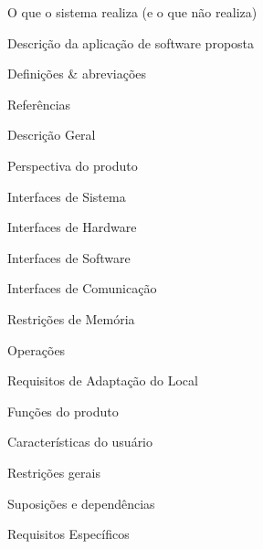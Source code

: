 ﻿\documentclass[12pt,a4paper]{article}
\begin{document}
\hspace{2cm}O que o sistema realiza (e o que não realiza)\dotfill \pageref{sec:SistemaRealiza}

\hspace{2cm}Descrição da aplicação de software proposta\dotfill \pageref{sec:DescricaoAplicacao}

\hspace{1cm}Definições \& abreviações\dotfill \pageref{sec:Definicoes}

\hspace{1cm}Referências\dotfill \pageref{sec:Referencias}

Descrição Geral\dotfill \pageref{sec:DescricaoGeral}

\hspace{1cm}Perspectiva do produto\dotfill \pageref{sec:PerspectivaProduto}

\hspace{2cm}Interfaces de Sistema\dotfill \pageref{sec:InterfaceSistema}

\hspace{2cm}Interfaces de Hardware\dotfill \pageref{sec:InterfaceHardware}

\hspace{2cm}Interfaces de Software\dotfill \pageref{sec:InterfaceSoftware}

\hspace{2cm}Interfaces de Comunicação\dotfill \pageref{sec:InterfaceComunicacao}

\hspace{2cm}Restrições de Memória\dotfill \pageref{sec:RestricoesMemoria}

\hspace{2cm}Operações\dotfill \pageref{sec:Operacoes}

\hspace{2cm}Requisitos de Adaptação do Local\dotfill \pageref{sec:RequisitosLocal}

\hspace{1cm}Funções do produto\dotfill \pageref{sec:FuncoesProduto}

\hspace{1cm}Características do usuário\dotfill \pageref{sec:CaracteristicasUsuario}

\hspace{1cm}Restrições gerais\dotfill \pageref{sec:RestricoesGerais}

\hspace{1cm}Suposições e dependências\dotfill \pageref{sec:Suposicoes}

Requisitos Específicos\dotfill \pageref{sec:RequisitosEspecificos}
\end{document}
